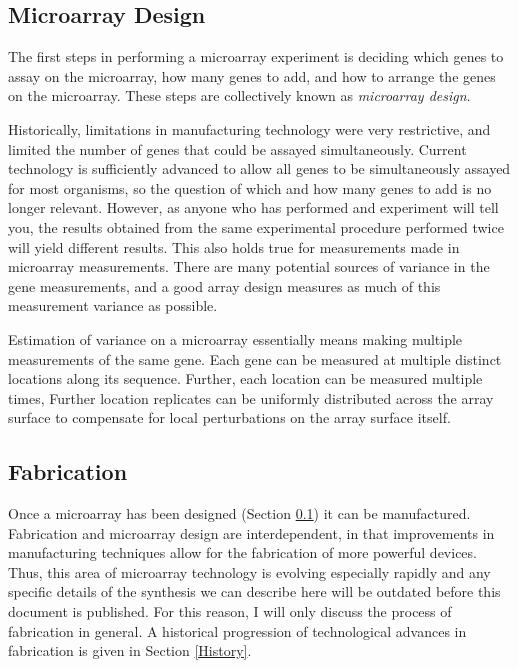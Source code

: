 {\subsection{Microarray Design}
\label{ArrayDesign}

The first steps in performing a microarray experiment is deciding which genes
to assay on the microarray, how many genes to add, and how to arrange the genes
on the microarray.  These steps are collectively known as \emph{microarray
design}.

Historically, limitations in manufacturing technology were very restrictive,
and limited the number of genes that could be assayed simultaneously.  Current
technology is sufficiently advanced to allow all genes to be simultaneously
assayed for most organisms, so the question of which and how many genes to add
is no longer relevant.  However, as anyone who has performed and experiment
will tell you, the results obtained from the same experimental procedure
performed twice will yield different results.  This also holds true for
measurements made in microarray measurements.  There are many potential sources
of variance in the gene measurements, and a good array design measures as much
of this measurement variance as possible.

Estimation of variance on a microarray essentially means making multiple
measurements of the same gene.  Each gene can be measured at multiple distinct
locations along its sequence.  Further, each location can be measured multiple
times, Further location replicates can be uniformly distributed across the
array surface to compensate for local perturbations on the array surface
itself.

\subsection{Fabrication}
\label{Fabrication}

Once a microarray has been designed (Section \ref{ArrayDesign}) it can be
manufactured.  Fabrication and microarray design are interdependent, in that
improvements in manufacturing techniques allow for the fabrication of more
powerful devices.  Thus, this area of microarray technology is evolving
especially rapidly and any specific details of the synthesis we can describe
here will be outdated before this document is published.  For this reason, I
will only discuss the process of fabrication in general.  A historical
progression of technological advances in fabrication is given in Section
\ref{History}.

}

